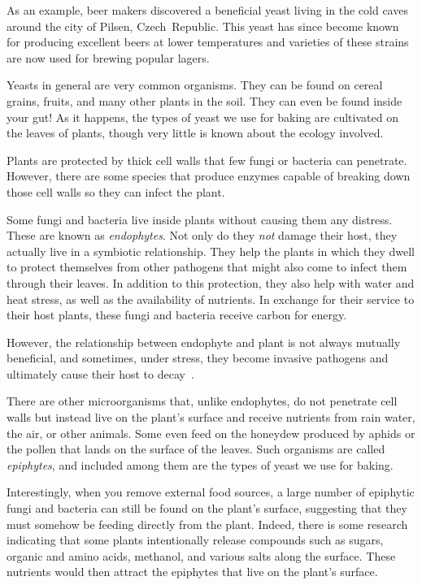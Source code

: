 As an example, beer makers discovered a beneficial yeast living in the cold
caves around the city of Pilsen, Czech~Republic. This yeast has since become
known for producing excellent beers at lower temperatures and varieties of
these strains are now used for brewing popular lagers.

Yeasts in general are very common organisms. They can be found on cereal
grains, fruits, and many other plants in the soil. They can even be found
inside your gut! As it happens, the types of yeast we use for baking are
cultivated on the leaves of plants, though very little is known about the
ecology involved.

Plants are protected by thick cell walls that few fungi or bacteria can
penetrate. However, there are some species that produce enzymes capable of
breaking down those cell walls so they can infect the plant.

Some fungi and bacteria live inside plants without causing them any distress.
These are known as \emph{endophytes}. Not only do they \emph{not} damage their
host, they actually live in a symbiotic relationship. They help the plants in
which they dwell to protect themselves from other pathogens that might also
come to infect them through their leaves. In addition to this protection, they
also help with water and heat stress, as well as the availability of nutrients.
In exchange for their service to their host plants, these fungi and bacteria
receive carbon for energy.

However, the relationship between endophyte and plant is not always mutually
beneficial, and sometimes, under stress, they become invasive pathogens and
ultimately cause their host to decay~\cite{endophytes+in+plants}.

There are other microorganisms that, unlike endophytes, do not penetrate cell
walls but instead live on the plant's surface and receive nutrients from rain
water, the air, or other animals. Some even feed on the honeydew produced by
aphids or the pollen that lands on the surface of the leaves. Such organisms
are called \emph{epiphytes}, and included among them are the types of yeast
we use for baking.

Interestingly, when you remove external food sources, a large number of
epiphytic fungi and bacteria can still be found on the plant's surface,
suggesting that they must somehow be feeding directly from the plant.
Indeed, there is some research indicating that some plants intentionally release
compounds such as sugars, organic and amino acids, methanol, and various
salts along the surface. These nutrients would then attract the epiphytes that
live on the plant's surface.

